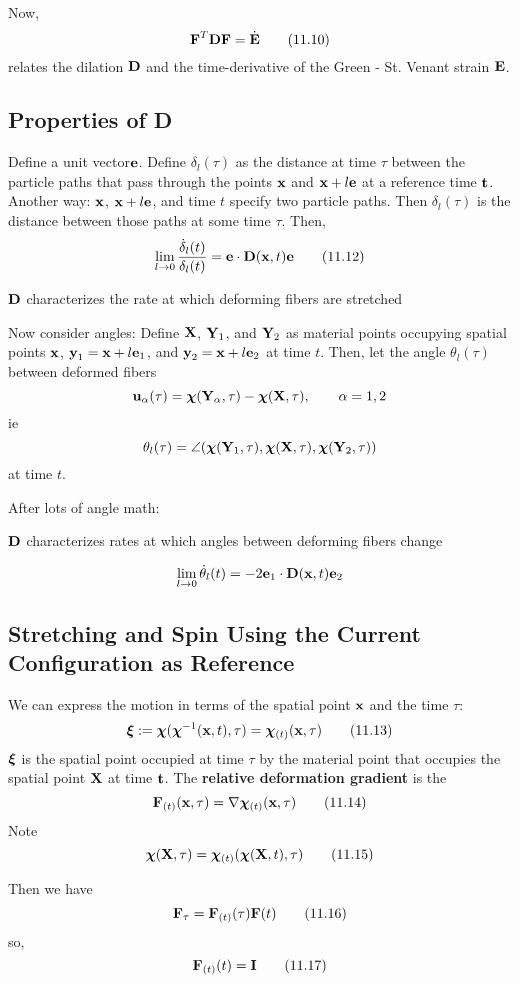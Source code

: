 \documentclass{article}
\newcommand{\Chi}{\boldsymbol{\chi}}
\begin{document}
Now,
\[
	\textbf{F}^T\textbf{D}\textbf{F} = \dot{\textbf{E}}\tag{11.10}
\]
relates the dilation $\textbf{D}$ and the time-derivative of the Green - St. Venant strain $\textbf{E}$.

\subsection{Properties of D}
Define a unit vector$\textbf{e}$. Define $\delta_l(\tau)$ as the distance at time $\tau$ between the particle paths that pass through the points $\textbf{x}$ and $\textbf{x} + l\textbf{e}$ at a reference time $\textbf{t}$. Another way: $\textbf{x}$, $\textbf{x} +l\textbf{e}$, and time $t$ specify two particle paths. Then $\delta_l(\tau)$ is the distance between those paths at some time $\tau$.
Then,
\[
	\lim\limits_{l\to 0}\frac{\dot{\delta}_l(t)}{\delta_l(t)} = \textbf{e}\cdot\textbf{D}(\textbf{x},t)\textbf{e}\tag{11.12}
\]
\begin{remark}
	$\textbf{D}$ characterizes the rate at which deforming fibers are stretched
\end{remark}

Now consider angles:
Define $\textbf{X}$, $\textbf{Y}_1$, and $\textbf{Y}_2$ as material points occupying spatial points $\textbf{x}$, $\textbf{y}_1= \textbf{x} + l\textbf{e}_1$, and $\textbf{y}_2 = \textbf{x} + l\textbf{e}_2$ at time $t$. Then, let the angle $\theta_l(\tau)$ between deformed fibers
\[
	\u_\alpha(\tau) = \Chi (\Y_\alpha, \tau ) - \Chi (\X, \tau ), \qquad \alpha = 1,2
\]
ie
\[
	\theta_l(\tau) = \angle(\Chi(\Y_1, \tau), \Chi(\X, \tau), \Chi(\Y_2, \tau))
\]
at time $t$.

After lots of angle math:
\begin{remark}
	$\textbf{D}$ characterizes rates at which angles between deforming fibers change
\end{remark}

\[
	\lim\limits_{l\to 0}\dot{\theta}_l(t) = -2\textbf{e}_1\cdot\textbf{D}(\textbf{x},t)\textbf{e}_2
\]

\subsection{Stretching and Spin Using the Current Configuration as Reference}
We can express the motion in terms of the spatial point $\textbf{x}$ and the time $\tau$:
\[
	\boldsymbol{\xi} \eqdef \Chi(\Chi\inv(\x,t),\tau) = \Chi_{(t)}(\x,\tau)\tag{11.13}
\]
$\boldsymbol{\xi}$ is the spatial point occupied at time $\tau$ by the material point that occupies the spatial point $\textbf{X}$ at time $\textbf{t}$.
The \textbf{relative deformation gradient} is the
\[
	\F_{(t)}(\x,\tau) = \del\Chi_{(t)}(\x,\tau)\tag{11.14}
\]
Note
\[
	\Chi(\X,\tau) = \Chi_{(t)}(\Chi(\X,t),\tau)\tag{11.15}
\]

Then we have
\[
	\textbf{F}_{\tau} = \textbf{F}_{(t)}(\tau)\textbf{F}(t)\tag{11.16}
\]
so,
\[
	\textbf{F}_{(t)}(t) = \textbf{I}\tag{11.17}
\]
\end{document}
